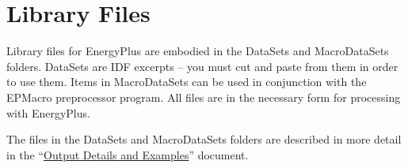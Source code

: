 \section{Library Files}\label{library-files}

Library files for EnergyPlus are embodied in the DataSets and MacroDataSets folders. DataSets are IDF excerpts -- you must cut and paste from them in order to use them. Items in MacroDataSets can be used in conjunction with the EPMacro preprocessor program. All files are in the necessary form for processing with EnergyPlus.

The files in the DataSets and MacroDataSets folders are described in more detail in the ``\href{OutputDetailsAndExamples.pdf}{Output Details and Examples}'' document.
